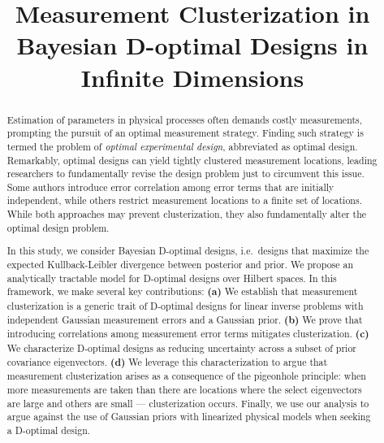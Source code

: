 \documentclass[ba]{imsart}
\theoremstyle{plain}
\theoremstyle{definition}
\theoremstyle{remark}
\begin{document}
\begin{frontmatter}
\title{Measurement Clusterization in Bayesian D-optimal Designs in Infinite Dimensions}



\begin{aug}
\author{ }

\address[addr1]{Azrieli Faculty of Medicine, Bar-Ilan University, Safed, Israel
     }

\end{aug}

\begin{abstract}
  Estimation of parameters in physical processes often demands costly
  measurements, prompting the pursuit of an optimal measurement
  strategy. Finding such strategy is termed the problem of
  \emph{optimal experimental design}, abbreviated as optimal
  design. Remarkably, optimal designs can yield tightly clustered
  measurement locations, leading researchers to fundamentally revise
  the design problem just to circumvent this issue. Some authors
  introduce error correlation among error terms that are initially
  independent, while others restrict measurement locations to a finite
  set of locations. While both approaches may prevent clusterization,
  they also fundamentally alter the optimal design problem.

  In this study, we consider Bayesian D-optimal designs, i.e.~designs
  that maximize the expected Kullback-Leibler divergence between
  posterior and prior. We propose an analytically tractable model for
  D-optimal designs over Hilbert spaces. In this framework, we make
  several key contributions: \textbf{(a)} We establish that
  measurement clusterization is a generic trait of D-optimal designs
  for linear inverse problems with independent Gaussian measurement
  errors and a Gaussian prior. \textbf{(b)} We prove that introducing
  correlations among measurement error terms mitigates
  clusterization. \textbf{(c)} We characterize D-optimal designs as
  reducing uncertainty across a subset of prior covariance
  eigenvectors. \textbf{(d)} We leverage this characterization to
  argue that measurement clusterization arises as a consequence of the
  pigeonhole principle: when more measurements are taken than there
  are locations where the select eigenvectors are large and others are
  small --- clusterization occurs. Finally, we use our analysis to
  argue against the use of Gaussian priors with linearized physical
  models when seeking a D-optimal design.
\end{abstract}

\begin{keyword}[class=MSC]
\end{keyword}

\end{frontmatter}
\end{document}
